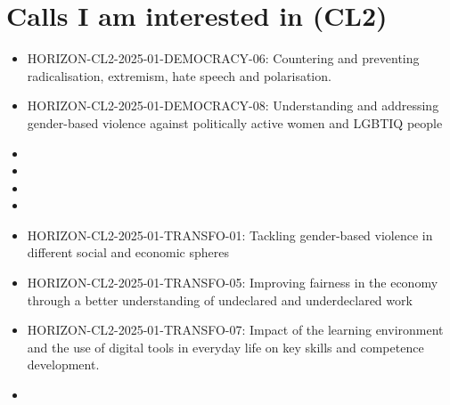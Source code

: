 \section{Calls I am interested in (CL2)}
\begin{itemize}
	\item HORIZON-CL2-2025-01-DEMOCRACY-06: Countering and preventing radicalisation, extremism, hate speech and polarisation.
	\item HORIZON-CL2-2025-01-DEMOCRACY-08: Understanding and addressing gender-based violence against politically active women and LGBTIQ people
	\item {}
	\item {}
	\item {}
	\item {}
	\item HORIZON-CL2-2025-01-TRANSFO-01: Tackling gender-based violence in different social and economic spheres
	\item HORIZON-CL2-2025-01-TRANSFO-05: Improving fairness in the economy through a better understanding of undeclared and underdeclared work
	\item HORIZON-CL2-2025-01-TRANSFO-07: Impact of the learning environment and the use  of digital tools in everyday life on key skills and competence development.
	\item {}
\end{itemize}

\printbibliography


